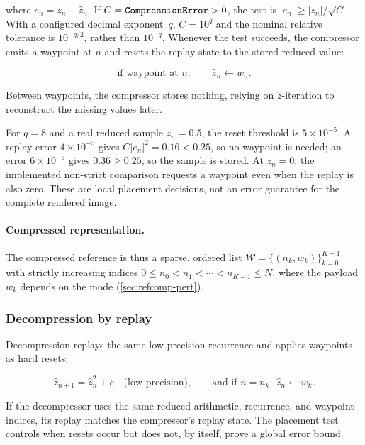where $e_n=z_n-\hat z_n$.  If $C=\texttt{CompressionError}>0$, the test
is $|e_n|\ge |z_n|/\sqrt C$.  With a configured decimal exponent~$q$,
$C=10^q$ and the nominal relative tolerance is $10^{-q/2}$, rather than
$10^{-q}$.  Whenever the test succeeds, the compressor emits a
waypoint at \(n\) and resets the replay state to the stored reduced value:

\begin{equation}
  \text{if waypoint at } n:\qquad \hat z_n \leftarrow w_n.
  \label{eq:waypoint-reset}
\end{equation}

Between waypoints, the compressor stores nothing, relying on \(\hat z\)-iteration
to reconstruct the missing values later.

For $q=8$ and a real reduced sample $z_n=0.5$, the reset threshold is
$5\times10^{-5}$.  A replay error $4\times10^{-5}$ gives
$C|e_n|^2=0.16<0.25$, so no waypoint is needed; an error
$6\times10^{-5}$ gives $0.36\ge0.25$, so the sample is stored.
At $z_n=0$, the implemented non-strict comparison requests a waypoint even
when the replay is also zero.  These are local placement decisions, not an
error guarantee for the complete rendered image.

\paragraph{Compressed representation.}
The compressed reference is thus a sparse, ordered list
\(
\mathcal{W} = \{(n_k, w_k)\}_{k=0}^{K-1}
\)
with strictly increasing indices \(0 \le n_0 < n_1 < \cdots < n_{K-1} \le N\),
where the payload \(w_k\) depends on the mode (\cref{sec:refcomp-pert}).

\subsubsection{Decompression by replay}

Decompression replays the same low-precision recurrence and applies waypoints as
hard resets:

\begin{equation}
  \hat z_{n+1} = \hat z_n^2 + c \quad\text{(low precision)},\qquad
  \text{and if } n = n_k:\ \hat z_n \leftarrow w_k.
  \label{eq:decompress-replay}
\end{equation}

If the decompressor uses the same reduced arithmetic, recurrence, and waypoint
indices, its replay matches the compressor's replay state.  The placement test
controls when resets occur but does not, by itself, prove a global error bound.

